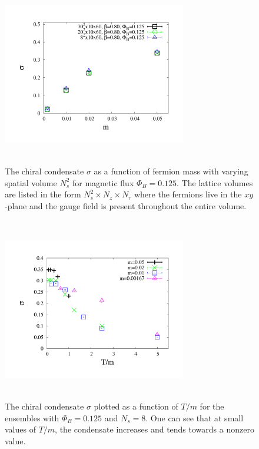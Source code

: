 \documentclass[aps,prd,twocolumn,showpacs,superscriptaddress,groupedaddress]{revtex4}  %
\begin{document}
\begin{figure}
\includegraphics[height=8cm,width=8cm]{pbp_vs_m_PHI0125_volcompare_3_graphene_paper.pdf} \hspace{-1cm}
\caption{The chiral condensate $\sigma$ as a function of fermion mass with varying spatial volume $N^2_s$ for magnetic flux $\Phi_B=0.125$. The lattice volumes are listed in the form $N_s^2\times N_z \times N_{\tau}$ where the fermions live in the $xy$-plane and the gauge field is present throughout the entire volume.}
\label{PBPVolume}
\end{figure}

\begin{figure}
 \includegraphics[height=8cm,width=8cm]{pbp_vs_TdivM_PHI0125_zoom_graphene_paper.pdf} \hspace{-1cm}
\caption{The chiral condensate $\sigma$ plotted as a function of $T/m$ for the ensembles with $\Phi_B=0.125$ and $N_s=8$. One can see that at small values of $T/m$, the condensate increases and tends towards a nonzero value.}
\label{PBPvsTdivM}
\end{figure}
\end{document}
